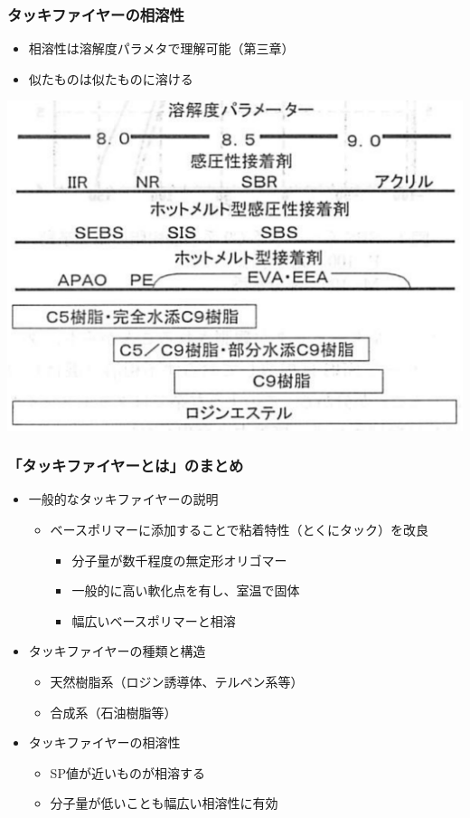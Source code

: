 \documentclass[unicode,12pt]{beamer}%
\begin{document}
\begin{frame}
	\frametitle{タッキファイヤーの相溶性}
		\begin{itemize}
			\item 相溶性は溶解度パラメタで理解可能（第三章）
			\item 似たものは似たものに溶ける
		\end{itemize}

			\vspace{3mm}
			\centering
				\includegraphics[width=.6\textwidth]{souyousei.png}
\end{frame}

\begin{frame}
	\frametitle{「タッキファイヤーとは」のまとめ}
        \begin{boxnote}
            \vspace{-3mm}
            \begin{itemize}
                \item 一般的なタッキファイヤーの説明
                    \begin{itemize}
                        \item ベースポリマーに添加することで粘着特性（とくにタック）を改良
                        \begin{itemize}
							\item \alert{分子量が数千程度}の無定形オリゴマー
							\item 一般的に\alert{高い軟化点}を有し、室温で固体
							\item 幅広いベースポリマーと\alert{相溶}
						\end{itemize}
                    \end{itemize} 
                \item タッキファイヤーの種類と構造
                    \begin{itemize}
                        \item 天然樹脂系（ロジン誘導体、テルペン系等）
                        \item 合成系（石油樹脂等）
                    \end{itemize} 
                \item タッキファイヤーの相溶性
                    \begin{itemize}
                        \item SP値が近いものが相溶する
						\item 分子量が低いことも幅広い相溶性に有効
                    \end{itemize}
            \end{itemize}
        \end{boxnote}
\end{frame}
\end{document}
